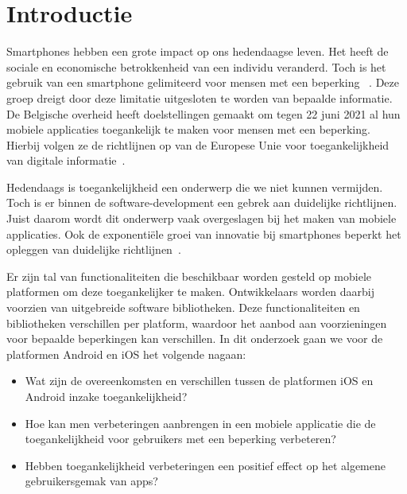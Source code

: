 
\section{Introductie} %
\label{sec:introductie}

Smartphones hebben een grote impact op ons hedendaagse leven. Het heeft de sociale en economische betrokkenheid van een individu veranderd.  Toch is het gebruik van een smartphone gelimiteerd voor mensen met een beperking
~\autocite{morris2014wireless}. Deze groep dreigt door deze limitatie uitgesloten te worden van bepaalde informatie. De Belgische overheid heeft doelstellingen gemaakt om tegen 22 juni 2021 al hun mobiele applicaties toegankelijk te maken voor mensen met een beperking. Hierbij volgen ze de richtlijnen op van de Europese Unie voor toegankelijkheid van digitale informatie~\autocite{Knacktoegankelijkheid2018}.

Hedendaags is toegankelijkheid een onderwerp die we niet kunnen vermijden. Toch is er binnen de software-development een gebrek aan duidelijke richtlijnen. Juist daarom wordt dit onderwerp vaak overgeslagen bij het maken van mobiele applicaties. Ook de exponentiële groei van innovatie bij smartphones beperkt het opleggen van duidelijke richtlijnen~\autocite{diaz2014accessibility}. 

Er zijn  tal van functionaliteiten die beschikbaar worden gesteld op mobiele platformen om deze toegankelijker te maken. Ontwikkelaars worden daarbij voorzien van uitgebreide software bibliotheken. Deze functionaliteiten en bibliotheken verschillen per platform, waardoor het aanbod aan voorzieningen voor bepaalde beperkingen kan verschillen. In dit onderzoek gaan we voor de platformen Android en iOS het volgende nagaan:




\begin{itemize}
    \setlength\itemsep{0.5 em}
    \item Wat zijn de overeenkomsten en verschillen tussen de platformen iOS en Android inzake toegankelijkheid?
  \item Hoe kan men verbeteringen aanbrengen in een mobiele applicatie die de toegankelijkheid voor gebruikers met een beperking verbeteren?
  \item Hebben toegankelijkheid verbeteringen een positief effect op het algemene gebruikersgemak van apps? 
  
\end{itemize}

